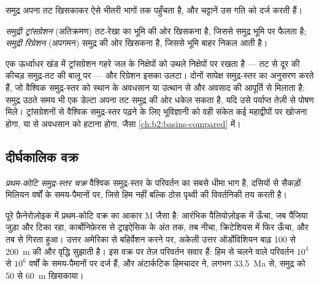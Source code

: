 समुद्र अपना तट खिसकाकर ऐसे भीतरी भागों तक पहुँचता है, और चट्टानें उस गति को दर्ज करती हैं।

\begin{definition}[समुद्री ट्रांसग्रेशन; समुद्री रिग्रेशन]\label{def:b2:phanerozoic-earth:transgression}
\emph{समुद्री ट्रांसग्रेशन} (अतिक्रमण) तट-रेखा का भूमि की ओर खिसकना है,
जिससे समुद्र भूमि पर फैलता है; \emph{समुद्री रिग्रेशन} (अपगमन)
समुद्र की ओर खिसकना है, जिससे भूमि बाहर निकल आती है।
\end{definition}

एक ऊर्ध्वाधर खंड में ट्रांसग्रेशन गहरे जल के निक्षेपों को उथले निक्षेपों पर रखता है ---
तट से दूर की कीचड़ समुद्र-तट की बालू पर --- और रिग्रेशन इसका उलटा। दोनों सापेक्ष समुद्र-स्तर
का अनुसरण करते हैं, जो वैश्विक समुद्र-स्तर को स्थान के अवधसान या उत्थान से और
अवसाद की आपूर्ति से मिलाता है: समुद्र उठते समय भी एक डेल्टा अपना तट समुद्र की ओर धकेल सकता है, यदि उसे पर्याप्त
तेज़ी से पोषण मिले। ट्रांसग्रेशनों से वैश्विक समुद्र-स्तर पढ़ने के लिए भूविज्ञानी को वही संकेत
कई महाद्वीपों पर खोजना होगा, या  से अवधसान को हटाना होगा, जैसा
\cref{ch:b2:basins-compared} में।

\subsection*{दीर्घकालिक वक्र}

\begin{definition}[प्रथम-कोटि समुद्र-स्तर चक्र]\label{def:b2:phanerozoic-earth:first-order}
\emph{प्रथम-कोटि समुद्र-स्तर चक्र} वैश्विक समुद्र-स्तर के परिवर्तन का सबसे धीमा
भाग है, दसियों से सैकड़ों मिलियन वर्षों के समय-पैमानों पर, जिसे हिम नहीं बल्कि
ठोस पृथ्वी की विवर्तनिकी तय करती है।
\end{definition}

पूरे फ़ैनेरोज़ोइक में प्रथम-कोटि वक्र का आकार M जैसा है: आरंभिक पैलियोज़ोइक में ऊँचा,
जब पैंजिया जुड़ा और टिका रहा, कार्बोनिफ़ेरस से ट्राइऐसिक के अंत तक, तब नीचा, क्रिटेशियस में फिर
ऊँचा, और तब से गिरता हुआ। उत्तर अमेरिका से बहिर्वेशन करने पर, अकेली उत्तर
ऑर्डोविशियन बाढ़ 100 से \qty{200}{m} की और वृद्धि सुझाती है।
इस वक्र पर तेज़ परिवर्तन सवार हैं: हिम से चलने वाले परिवर्तन $10^4$ से
$10^6$ वर्षों के समय-पैमानों पर दर्ज हैं, और अंटार्कटिक हिमचादर ने, लगभग \qty{33.5}{Ma} से, समुद्र को 50 से
\qty{60}{m} खिसकाया।

